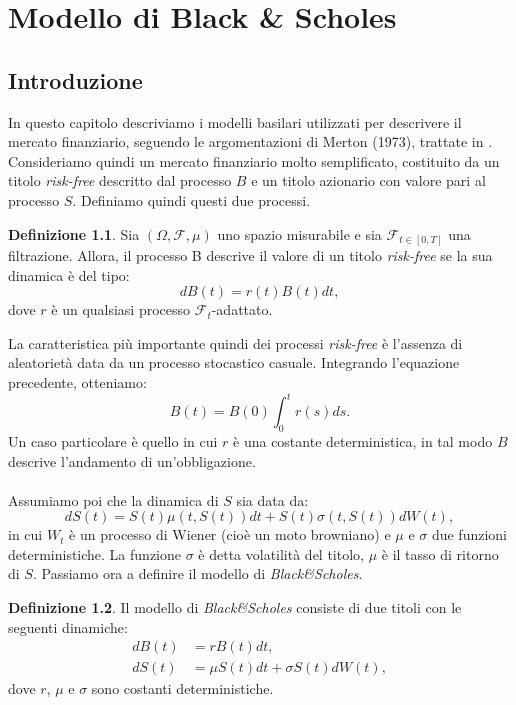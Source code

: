 \documentclass[a4paper,10pt]{report}
\theoremstyle{plain}
\theoremstyle{definition}
\newtheorem{definition}{Definizione}[chapter]
\theoremstyle{remark}
\newtheorem{osservazione}{Osservazione}[chapter]
\begin{document}
\chapter{Modello di Black \& Scholes}

\section{Introduzione}
In questo capitolo descriviamo i modelli basilari utilizzati per descrivere il mercato finanziario, seguendo le argomentazioni di Merton (1973), trattate in \cite{bjork2009arbitrage}. Consideriamo quindi un mercato finanziario molto semplificato, costituito da un titolo \emph{risk-free} descritto dal processo $B$ e un titolo azionario con valore pari al processo $S$. Definiamo quindi questi due processi.
\begin{definition}
Sia $(\Omega,\mathcal{F},\mu)$ uno spazio misurabile e sia $\mathcal{F}_{t\in [ 0,T ]}$ una filtrazione. Allora, il processo B descrive il valore di un titolo \emph{risk-free} se la sua dinamica \`e del tipo: $$dB(t)=r(t)B(t)dt,$$dove $r$ \`e un qualsiasi processo $\mathcal{F}_t$-adattato.
\end{definition}
La caratteristica pi\`u importante quindi dei processi \emph{risk-free} \`e l'assenza di aleatoriet\`a data da un processo stocastico casuale. Integrando l'equazione precedente, otteniamo: $$B(t)=B(0)\int_0^tr(s)ds.$$ Un caso particolare \`e quello in cui $r$ \`e una costante deterministica, in tal modo $B$ descrive l'andamento di un'obbligazione.\\\\Assumiamo poi che la dinamica di $S$ sia data da: $$dS(t)=S(t)\mu(t,S(t))dt+S(t)\sigma(t,S(t))dW(t),$$ in cui $W_t$ \`e un processo di Wiener (cio\`e un moto browniano) e $\mu$ e $\sigma$ due funzioni deterministiche. La funzione $\sigma$ \`e detta volatilit\`a del titolo, $\mu$ \`e il tasso di ritorno di $S$.
Passiamo ora a definire il modello di \emph{Black\&Scholes}.
\begin{definition}
Il modello di \emph{Black\&Scholes} consiste di due titoli con le seguenti dinamiche:
\begin{align*}
dB(t)&=rB(t)dt,\\
dS(t)&=\mu S(t)dt+\sigma S(t)dW(t),
\end{align*}
dove $r$, $\mu$ e $\sigma$ sono costanti deterministiche.
\end{definition}
\end{document}
